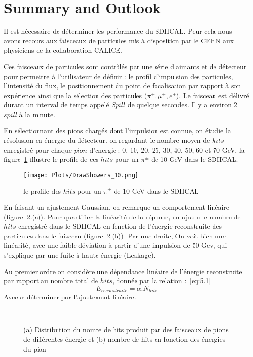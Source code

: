 \section{Summary and Outlook}
\label{p5}

Il est n\'ecessaire de déterminer les performance du SDHCAL. Pour cela nous avons recours aux faisceaux de particules mis \`a disposition par le CERN aux physiciens de la collaboration CALICE.
\par Ces faisceaux de particules sont contr\^ol\'es par une s\'erie d’aimants et de d\'etecteur pour permettre \`a l’utilisateur de d\'efinir : le profil d’impulsion des particules, l’intensit\'e du flux, le positionnement du point de focalisation par rapport \`a son exp\'erience ainsi que la s\'election des particules ($\pi^{\pm}, \mu^{\pm}, e^{\pm}$). Le faisceau est d\'elivré durant un interval de temps appel\'e $Spill$ de quelque secondes. Il y a environ 2 $spill$ \`a la minute. 
\par En s\'electionnant des pions charg\'es dont l’impulsion est connue, on \'etudie la r\'esolusion en \'energie du d\'etecteur. on regardant le nombre moyen de $hits$ enregistr\'e pour chaque $pion$ d'\'energie : 0, 10, 20, 25, 30, 40, 50, 60 et 70 GeV, la figure~\ref{fig:5.1} illustre le profile de ces $hits$ pour un $\pi^{\pm}$ de 10 GeV dans le SDHCAL.\\
\begin{figure}[H]
  \centering
  \texttt{[image: Plots/DrawShowers\_10.png]}
  \caption{le profile des $hits$ pour un $\pi^{\pm}$ de 10 GeV dans le SDHCAL}
  \label{fig:5.1}
\end{figure}

En faisant un ajustement Gaussian, on remarque un comportement lin\'eaire (figure~\ref{figure:5.2}.(a)). Pour quantifier la linéarité de la réponse, on ajuste le nombre de $hits$ enregistr\'e dans le SDHCAL en fonction de l'\'energie reconstruite des particules dans le faisceau (figure~\ref{figure:5.2}.(b)). Par une droite, On voit bien une lin\'earit\'e, avec une faible d\'eviation \`a partir d'une impulsion de 50 Gev, qui s'explique par une fuite \`a haute \'energie (Leakage).
~\par Au premier ordre on consid\`ere une d\'ependance lin\'eaire de l'\'energie reconstruite par rapport au nombre total de $hits$, donn\'ee par la relation :~\eqref{eq:5.1}
\begin{equation}
  \label{eq:5.1}
  E_{reconstruite}=\alpha.N_{hits}
\end{equation}
Avec $\alpha$ déterminer par l'ajustement linéaire.
\begin{figure}[H]
  \centering 
  \mbox{ }
  \caption{(a) Distribution du nomre de hits produit par des faisceaux de pions de diff\'erentes \'energie et (b) nombre de hits en fonction des \'energies du pion} 
  \label{figure:5.2}
\end{figure}


